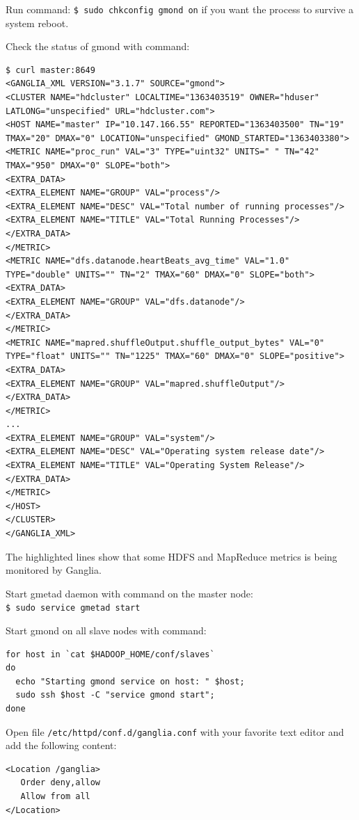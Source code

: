 Run command: \verb|$ sudo chkconfig gmond on| if you want the process to survive a system reboot.

Check the status of gmond with command: 
\begin{verbatim}
$ curl master:8649
<GANGLIA_XML VERSION="3.1.7" SOURCE="gmond">
<CLUSTER NAME="hdcluster" LOCALTIME="1363403519" OWNER="hduser" LATLONG="unspecified" URL="hdcluster.com">
<HOST NAME="master" IP="10.147.166.55" REPORTED="1363403500" TN="19" TMAX="20" DMAX="0" LOCATION="unspecified" GMOND_STARTED="1363403380">
<METRIC NAME="proc_run" VAL="3" TYPE="uint32" UNITS=" " TN="42" TMAX="950" DMAX="0" SLOPE="both">
<EXTRA_DATA>
<EXTRA_ELEMENT NAME="GROUP" VAL="process"/>
<EXTRA_ELEMENT NAME="DESC" VAL="Total number of running processes"/>
<EXTRA_ELEMENT NAME="TITLE" VAL="Total Running Processes"/>
</EXTRA_DATA>
</METRIC>
<METRIC NAME="dfs.datanode.heartBeats_avg_time" VAL="1.0" TYPE="double" UNITS="" TN="2" TMAX="60" DMAX="0" SLOPE="both">
<EXTRA_DATA>
<EXTRA_ELEMENT NAME="GROUP" VAL="dfs.datanode"/>
</EXTRA_DATA>
</METRIC>
<METRIC NAME="mapred.shuffleOutput.shuffle_output_bytes" VAL="0" TYPE="float" UNITS="" TN="1225" TMAX="60" DMAX="0" SLOPE="positive">
<EXTRA_DATA>
<EXTRA_ELEMENT NAME="GROUP" VAL="mapred.shuffleOutput"/>
</EXTRA_DATA>
</METRIC>
...
<EXTRA_ELEMENT NAME="GROUP" VAL="system"/>
<EXTRA_ELEMENT NAME="DESC" VAL="Operating system release date"/>
<EXTRA_ELEMENT NAME="TITLE" VAL="Operating System Release"/>
</EXTRA_DATA>
</METRIC>
</HOST>
</CLUSTER>
</GANGLIA_XML>
\end{verbatim}

The highlighted lines show that some HDFS and MapReduce metrics is being monitored by Ganglia.

Start gmetad daemon with command on the master node: \\
\verb|$ sudo service gmetad start|

Start gmond on all slave nodes with command: 
\begin{verbatim}
for host in `cat $HADOOP_HOME/conf/slaves`
do
  echo "Starting gmond service on host: " $host;
  sudo ssh $host -C "service gmond start";
done
\end{verbatim}

Open file \verb|/etc/httpd/conf.d/ganglia.conf| with your favorite text editor and add the following content: 
\begin{verbatim}
<Location /ganglia>
   Order deny,allow
   Allow from all
</Location>
\end{verbatim}

